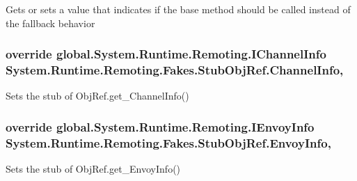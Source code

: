 Gets or sets a value that indicates if the base method should be called instead of the fallback behavior

\hypertarget{class_system_1_1_runtime_1_1_remoting_1_1_fakes_1_1_stub_obj_ref_a2a0cc723a5c24c70bb1d515568ef44f8}{
\subsubsection[{Channel\-Info}]{\setlength{\rightskip}{0pt plus 5cm}override global.\-System.\-Runtime.\-Remoting.\-I\-Channel\-Info System.\-Runtime.\-Remoting.\-Fakes.\-Stub\-Obj\-Ref.\-Channel\-Info\hspace{0.3cm}{\ttfamily [get]}, {\ttfamily [set]}}}\label{class_system_1_1_runtime_1_1_remoting_1_1_fakes_1_1_stub_obj_ref_a2a0cc723a5c24c70bb1d515568ef44f8}


Sets the stub of Obj\-Ref.\-get\-\_\-\-Channel\-Info()

\hypertarget{class_system_1_1_runtime_1_1_remoting_1_1_fakes_1_1_stub_obj_ref_a6b9da8d70ce66e8bb4f774c65b0eeee8}{
\subsubsection[{Envoy\-Info}]{\setlength{\rightskip}{0pt plus 5cm}override global.\-System.\-Runtime.\-Remoting.\-I\-Envoy\-Info System.\-Runtime.\-Remoting.\-Fakes.\-Stub\-Obj\-Ref.\-Envoy\-Info\hspace{0.3cm}{\ttfamily [get]}, {\ttfamily [set]}}}\label{class_system_1_1_runtime_1_1_remoting_1_1_fakes_1_1_stub_obj_ref_a6b9da8d70ce66e8bb4f774c65b0eeee8}


Sets the stub of Obj\-Ref.\-get\-\_\-\-Envoy\-Info()

